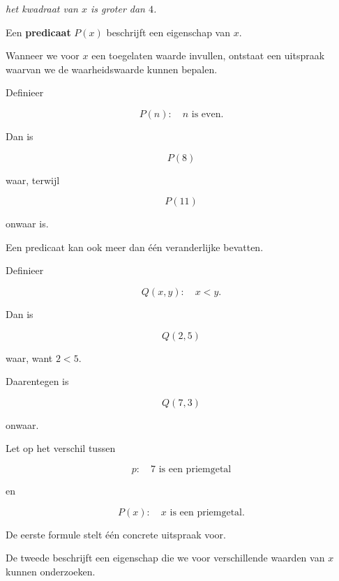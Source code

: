 \documentclass{ximera}
\begin{document}
\begin{center}
\textit{het kwadraat van $x$ is groter dan $4$.}
\end{center}


\begin{definitie}
Een \textbf{predicaat} $P(x)$ beschrijft een eigenschap van $x$.

Wanneer we voor $x$ een toegelaten waarde invullen, ontstaat een
uitspraak waarvan we de waarheidswaarde kunnen bepalen.
\end{definitie}


\begin{voorbeeld}

Definieer

\[
P(n):\quad n\text{ is even}.
\]

Dan is

\[
P(8)
\]

waar, terwijl

\[
P(11)
\]

onwaar is.
\end{voorbeeld}


Een predicaat kan ook meer dan één veranderlijke bevatten.


\begin{voorbeeld}

Definieer

\[
Q(x,y):\quad x<y.
\]

Dan is

\[
Q(2,5)
\]

waar, want $2<5$.

Daarentegen is

\[
Q(7,3)
\]

onwaar.
\end{voorbeeld}


\begin{opmerking}
Let op het verschil tussen

\[
p:\quad 7\text{ is een priemgetal}
\]

en

\[
P(x):\quad x\text{ is een priemgetal}.
\]

De eerste formule stelt één concrete uitspraak voor.

De tweede beschrijft een eigenschap die we voor verschillende waarden
van $x$ kunnen onderzoeken.
\end{opmerking}


\end{document}
